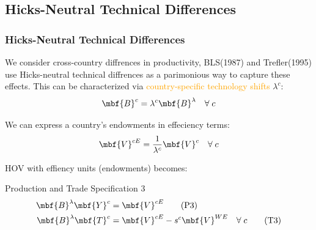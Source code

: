 \documentclass[xcolor=svgnames,10pt]{beamer}
\begin{document}
\subsection{Hicks-Neutral Technical Differences}
\begin{frame}[c]\frametitle{Hicks-Neutral Technical Differences}
We consider cross-country diffrences in productivity, BLS(1987) and Trefler(1995) use Hicks-neutral technical diffrences as a parimonious way to capture these effects. This can be characterized via \textcolor{orange}{country-specific technology shifts} ${\lambda}^{c}$:
\begin{equation}
\mbf{B}^{c}=\lambda^{c} \mbf{B}^{\lambda} \quad  \forall\; c
\end{equation}

We can express a country\rq{}s endowments in effeciency terms:
\begin{equation}
\mbf{V}^{cE} = \frac{1}{\lambda^{c}} \mbf{V}^{c} \quad \forall\; c
\end{equation}

HOV with effiency units (endowments) becomes:
\begin{block}{Production and Trade Specification 3}
\begin{align}
\mbf{B}^{\lambda} \mbf{Y}^{c} &= \mbf{V}^{cE} \tag{P3} \\
\mbf{B}^{\lambda} \mbf{T}^{c} &= \mbf{V}^{cE} - s^{c} \mbf{V}^{WE} \quad \forall\; c \tag{T3}
\end{align}
\end{block}


\end{frame}
\end{document}
